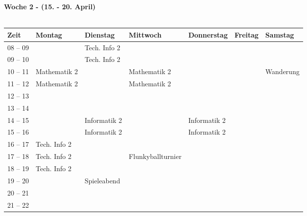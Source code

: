 \pagebreak
\textbf{Woche 2 - (15. - 20. April)}\\
\\
\begin{tabular}{|l|p{}|p{}|p{}|p{}|p{}|p{}|} \hline
 Zeit & Montag & Dienstag & Mittwoch & Donnerstag & Freitag & Samstag \\ 
 \hline \hline \cline{3-3}
 08 -- 09 & &\footnotesize{Tech. Info 2} & & & &\\ \cline{1-1}
 09 -- 10 & &\footnotesize{Tech. Info 2} & & & &  \\ \cline{1-1} \cline{3-3} \cline{2-2} \cline{4-4}
 10 -- 11 &\footnotesize{Mathematik 2} & &\footnotesize{Mathematik 2} & & & \cellcolor{lightlightgray} \footnotesize{Wanderung}\\ \cline{1-1}
 11 -- 12 &\footnotesize{Mathematik 2} & &\footnotesize{Mathematik 2} & & &\cellcolor{lightlightgray}\\ \cline{1-1} \cline{2-2} \cline{4-4}
 12 -- 13 & & & & & &\cellcolor{lightlightgray} \\ \cline{1-1} 
 13 -- 14 & & & & & & \cellcolor{lightlightgray} \\ \cline{1-1} \cline{3-3} \cline{5-5}
 14 -- 15 & &\footnotesize{Informatik 2} & &\footnotesize{Informatik 2} & & \cellcolor{lightlightgray} \\ \cline{1-1}
 15 -- 16 & &\footnotesize{Informatik 2} & &\footnotesize{Informatik 2} & & \cellcolor{lightlightgray}\\ \cline {1-1} \cline{3-3} \cline{5-5} \cline{2-2}
 16 -- 17 & \footnotesize{Tech. Info 2}& & & & & \cellcolor{lightlightgray}\\ \cline{1-1}
 17 -- 18 &\footnotesize{Tech. Info 2} & &\cellcolor{lightlightgray} \footnotesize{Flunkyballturnier} & & & \\ \cline{1-1}
 18 -- 19 &\footnotesize{Tech. Info 2} & &\cellcolor{lightlightgray}  & & &  \\ \cline{1-2}
 19 -- 20 & &\cellcolor{lightlightgray} \footnotesize{Spieleabend} & \cellcolor{lightlightgray} & & & \\ \cline{1-1}
 20 -- 21 & &\cellcolor{lightlightgray} &\cellcolor{lightlightgray}  & & & \\ \cline{1-1}
 21 -- 22 & &\cellcolor{lightlightgray} & \cellcolor{lightlightgray} & & & \\ \hline
\end{tabular}
\\

